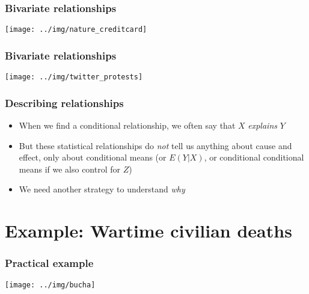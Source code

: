 \documentclass[aspectratio=43]{beamer}
\begin{document}
\begin{frame}
\frametitle{Bivariate relationships}
\centering

\texttt{[image: ../img/nature\_creditcard]}

\end{frame}

\begin{frame}
\frametitle{Bivariate relationships}
\centering

\texttt{[image: ../img/twitter\_protests]}

\end{frame}

\begin{frame}
\frametitle{Describing relationships}
\centering

\begin{itemize}
  \item When we find a conditional relationship, we often say that $X$ \textit{explains} $Y$
  \item But these statistical relationships do \textit{not} tell us anything about cause and effect, only about conditional means (or $E(Y|X)$, or conditional conditional means if we also control for $Z$)
  \item We need another strategy to understand \textit{why}
\end{itemize}

\end{frame}

\section{Example: Wartime civilian deaths}

\begin{frame}
\frametitle{Practical example}
\centering

\texttt{[image: ../img/bucha]}
  

\end{frame}
  
\end{document}
